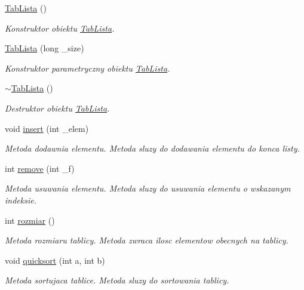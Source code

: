 \begin{DoxyCompactItemize}
\item 
\hyperlink{class_tab_lista_ad3bfa98306e98b4e5bb7ff524e72078c}{Tab\-Lista} ()
\begin{DoxyCompactList}\small\item\em Konstruktor obiektu \hyperlink{class_tab_lista}{Tab\-Lista}. \end{DoxyCompactList}\item 
\hyperlink{class_tab_lista_a95d23d52e0af187351b3fc1022ae4839}{Tab\-Lista} (long \-\_\-size)
\begin{DoxyCompactList}\small\item\em Konstruktor parametryczny obiektu \hyperlink{class_tab_lista}{Tab\-Lista}. \end{DoxyCompactList}\item 
\hyperlink{class_tab_lista_a0b4a808158b370bbc5785ceef760a273}{$\sim$\-Tab\-Lista} ()
\begin{DoxyCompactList}\small\item\em Destruktor obiektu \hyperlink{class_tab_lista}{Tab\-Lista}. \end{DoxyCompactList}\item 
void \hyperlink{class_tab_lista_a7bd3e5f62a81bfd3813ad874e8a9c059}{insert} (int \-\_\-elem)
\begin{DoxyCompactList}\small\item\em Metoda dodawnia elementu. Metoda sluzy do dodawania elementu do konca listy. \end{DoxyCompactList}\item 
int \hyperlink{class_tab_lista_aae59a3eafbbd7424a952badb26410a5e}{remove} (int \-\_\-f)
\begin{DoxyCompactList}\small\item\em Metoda usuwania elementu. Metoda sluzy do usuwania elementu o wskazanym indeksie. \end{DoxyCompactList}\item 
int \hyperlink{class_tab_lista_ac4b9b266a861fc7ecffd60257a480991}{rozmiar} ()
\begin{DoxyCompactList}\small\item\em Metoda rozmiaru tablicy. Metoda zwraca ilosc elementow obecnych na tablicy. \end{DoxyCompactList}\item 
void \hyperlink{class_tab_lista_a7e7acd97b2675b82b9a0f50907e87c22}{quicksort} (int a, int b)
\begin{DoxyCompactList}\small\item\em Metoda sortujaca tablice. Metoda sluzy do sortowania tablicy. \end{DoxyCompactList}\end{DoxyCompactItemize}

